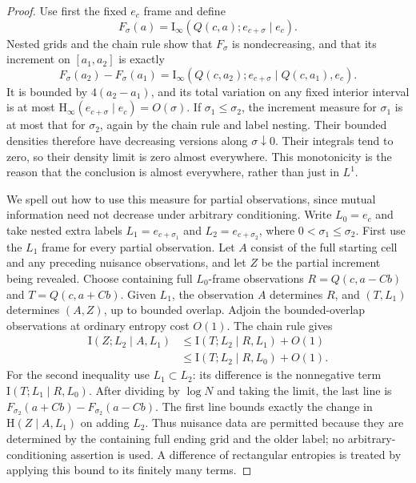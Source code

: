 \begin{proof}
Use first the fixed $e_c$ frame and define
\[
 F_\sigma(a)=\mathrm I_\infty
                 (Q(c,a);e_{c+\sigma}\mid e_c).
\]
Nested grids and the chain rule show that $F_\sigma$ is nondecreasing,
and that its increment on $[a_1,a_2]$ is exactly
\begin{equation}
 F_\sigma(a_2)-F_\sigma(a_1)
  =\mathrm I_\infty
    (Q(c,a_2);e_{c+\sigma}\mid Q(c,a_1),e_c).
 \label{eq:label-increment-information}
\end{equation}
It is bounded by $4(a_2-a_1)$, and its total variation on any fixed
interior interval is at most
$\mathrm H_\infty(e_{c+\sigma}\mid e_c)=O(\sigma)$.
If $\sigma_1\le\sigma_2$, the increment measure for $\sigma_1$
is at most that for $\sigma_2$, again by the chain rule and label
nesting.  Their bounded densities therefore have decreasing versions
along $\sigma\downarrow0$.  Their integrals tend to zero, so their
density limit is zero almost everywhere.  This monotonicity is the
reason that the conclusion is almost everywhere, rather than just in
$L^1$.

We spell out how to use this measure for partial observations, since
mutual information need not decrease under arbitrary conditioning.
Write $L_0=e_c$ and take nested extra labels
$L_1=e_{c+\sigma_1}$ and $L_2=e_{c+\sigma_2}$, where
$0<\sigma_1\le\sigma_2$. First use the $L_1$ frame for every
partial observation. Let $A$ consist of the full starting cell and any
preceding nuisance observations, and let $Z$ be the partial increment
being revealed. Choose containing full $L_0$-frame observations
$R=Q(c,a-Cb)$ and $T=Q(c,a+Cb)$.
Given $L_1$, the observation $A$ determines $R$, and $(T,L_1)$
determines $(A,Z)$, up to bounded overlap. Adjoin the bounded-overlap
observations at ordinary entropy cost $O(1)$. The chain rule gives
\begin{align}
 \mathrm I(Z;L_2\mid A,L_1)
 &\le \mathrm I(T;L_2\mid R,L_1)+O(1)\nonumber\\
 &\le \mathrm I(T;L_2\mid R,L_0)+O(1).
 \label{eq:label-containing-chain}
\end{align}
For the second inequality use $L_1\subset L_2$: its difference is
the nonnegative term $\mathrm I(T;L_1\mid R,L_0)$.
After dividing by $\log N$ and taking the limit, the last line is
$F_{\sigma_2}(a+Cb)-F_{\sigma_2}(a-Cb)$.
The first line bounds exactly the change in
$\mathrm H(Z\mid A,L_1)$ on adding $L_2$. Thus nuisance data are
permitted because they are determined by the containing full ending
grid and the older label; no arbitrary-conditioning assertion is used.
A difference of rectangular entropies is treated by applying this
bound to its finitely many terms.


\end{proof}

